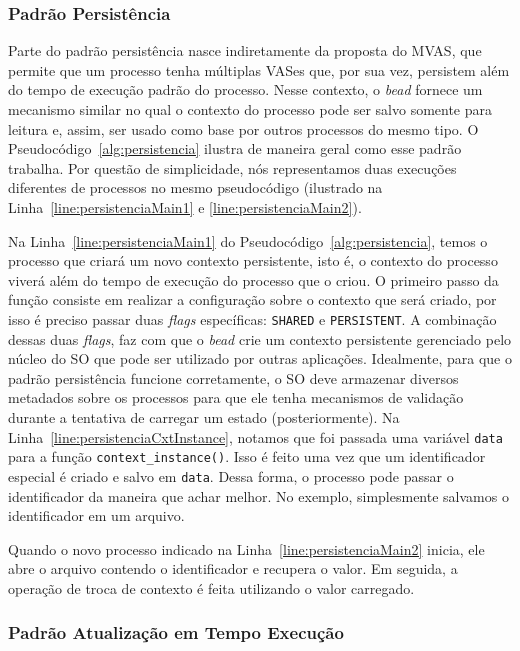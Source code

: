 \subsubsection{Padrão Persistência}

Parte do padrão persistência nasce indiretamente da proposta do MVAS, que
permite que um processo tenha múltiplas VASes que, por sua vez, persistem além do
tempo de execução padrão do processo. Nesse contexto, o \emph{bead} fornece um
mecanismo similar no qual o contexto do processo pode ser salvo somente
para leitura e, assim, ser usado como base por outros processos do mesmo tipo. O
Pseudocódigo~\ref{alg:persistencia} ilustra de maneira geral como esse
padrão trabalha. Por questão de simplicidade, nós representamos duas execuções
diferentes de processos no mesmo pseudocódigo (ilustrado na
Linha~\ref{line:persistenciaMain1} e \ref{line:persistenciaMain2}).



Na Linha~\ref{line:persistenciaMain1} do Pseudocódigo~\ref{alg:persistencia},
temos o processo que criará um novo contexto persistente, isto é, o contexto do
processo viverá além do tempo de execução do processo que o criou. O primeiro
passo da função consiste em realizar a configuração sobre o contexto que será
criado, por isso é preciso passar duas \emph{flags} específicas:
\texttt{SHARED} e \texttt{PERSISTENT}. A combinação dessas duas \emph{flags},
faz com que o \emph{bead} crie um contexto persistente gerenciado pelo núcleo
do SO que pode ser utilizado por outras aplicações. Idealmente, para que o
padrão persistência funcione corretamente, o SO deve armazenar diversos
metadados sobre os processos para que ele tenha mecanismos de validação durante
a tentativa de carregar um estado (posteriormente). Na
Linha~\ref{line:persistenciaCxtInstance}, notamos que foi passada uma variável
\texttt{data} para a função \texttt{context\_instance()}. Isso é feito uma vez
que um identificador especial é criado e salvo em \texttt{data}. Dessa forma, o
processo pode passar o identificador da maneira que achar melhor. No exemplo,
simplesmente salvamos o identificador em um arquivo.

Quando o novo processo indicado na Linha~\ref{line:persistenciaMain2} inicia,
ele abre o arquivo contendo o identificador e recupera o valor. Em seguida, a
operação de troca de contexto é feita utilizando o valor carregado.

\subsubsection{Padrão Atualização em Tempo Execução}
\label{sec:ate}

